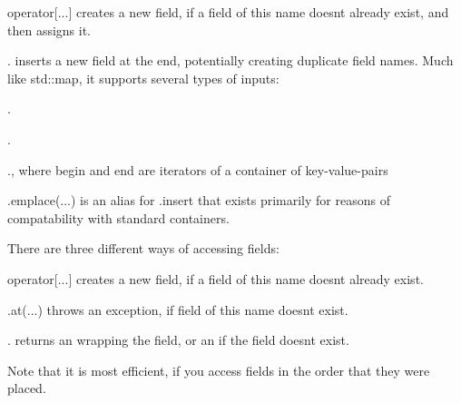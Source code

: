 \begin{DoxyItemize}
\item {\ttfamily operator\mbox{[}...\mbox{]}} creates a new field, if a field of this name doesn\textquotesingle{}t already exist, and then assigns it.
\item {\ttfamily .} inserts a new field at the end, potentially creating duplicate field names. Much like {\ttfamily std\+::map}, it supports several types of inputs\+:
\begin{DoxyItemize}
\item {\ttfamily .}
\item {\ttfamily .}
\item {\ttfamily .}, where {\ttfamily begin} and {\ttfamily end} are iterators of a container of key-\/value-\/pairs
\end{DoxyItemize}
\item {\ttfamily .emplace(...)} is an alias for {\ttfamily .insert} that exists primarily for reasons of compatability with standard containers.
\end{DoxyItemize}

There are three different ways of accessing fields\+:


\begin{DoxyItemize}
\item {\ttfamily operator\mbox{[}...\mbox{]}} creates a new field, if a field of this name doesn\textquotesingle{}t already exist.
\item {\ttfamily .at(...)} throws an exception, if field of this name doesn\textquotesingle{}t exist.
\item {\ttfamily .} returns an {\ttfamily {}} wrapping the field, or an {\ttfamily {}} if the field doesn\textquotesingle{}t exist.
\end{DoxyItemize}

Note that it is most efficient, if you access fields in the order that they were placed. 